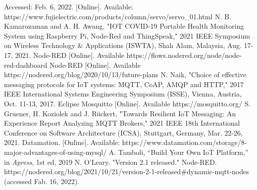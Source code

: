 \documentclass[conference]{IEEEtran}
\begin{document}
\begin{thebibliography}{00}
Accessed: Feb. 6, 2022. [Online]. Available: https://www.fujielectric.com/products/column/servo/servo\_01.html
N. B. Kamarozaman and A. H. Awang, "IOT COVID-19 Portable Health Monitoring System using Raspberry Pi, Node-Red and ThingSpeak," 2021 IEEE Symposium on Wireless Technology \& Applications (ISWTA), Shah Alam, Malaysia, Aug. 17-17, 2021.
Node-RED [Online]. Available https://flows.nodered.org/node/node-red-dashboard
Node-RED [Online]. Available https://nodered.org/blog/2020/10/13/future-plans
N. Naik, "Choice of effective messaging protocols for IoT systems: MQTT, CoAP, AMQP and HTTP," 2017 IEEE International Systems Engineering Symposium (ISSE), Vienna, Austria, Oct. 11-13, 2017.
Eclipse Mosquitto [Online]. Available https://mosquitto.org/
S. Gruener, H. Koziolek and J. Rückert, "Towards Resilient IoT Messaging: An Experience Report Analyzing MQTT Brokers," 2021 IEEE 18th International Conference on Software Architecture (ICSA), Stuttgart, Germany, Mar. 22-26, 2021.
Datamation. [Online]. Available: https://www.datamation.com/storage/8-major-advantages-of-using-mysql/
A. Tamboli, “Build Your Own IoT Platform,” in \textit{Apress}, 1st ed, 2019
N. O'Leary. "Version 2.1 released." Node-RED. https://nodered.org/blog/2021/10/21/version-2-1-released\#dynamic-mqtt-nodes (accessed Fab. 16, 2022).

\end{thebibliography}
\vspace{12pt}
\end{document}
